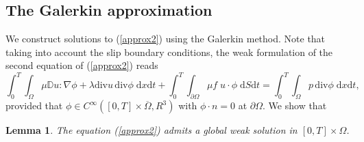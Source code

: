 \documentclass[11pt]{article}
\newcommand{\dd}{\mathrm{d}}
\newcommand{\ddiv}{\mathrm{div\,}}
\renewcommand{\div}{\mathrm{div}}
\newtheorem{lem}[tw]{Lemma}
\numberwithin{equation}{section}
\numberwithin{tw}{section}
\begin{document}


\subsection{The Galerkin approximation}
We  construct  solutions to (\ref{approx2}) using the Galerkin method. Note that taking into account the slip boundary conditions, the weak formulation of the second equation of (\ref{approx2}) reads
\begin{equation}
\int_0^T\int_\Omega \mu\mathbb{D}u:\nabla\phi + \lambda \div u \,\div \phi \;\dd x\dd t + \int_0^T\int_{\partial\Omega} \mu f \; u\cdot\phi\;\dd S\dd t =
\int_0^T\int_\Omega p \,\div \phi \;\dd x\dd t,
\end{equation}
provided that $\phi \in C^\infty([0,T]\times\overline{\Omega},R^3)$ with $\phi \cdot n=0$ at $\partial \Omega$. We show that

\begin{lem}
    The equation (\ref{approx2}) admits a global weak solution in $[0,T]\times\Omega$.
\end{lem}
\end{document}
